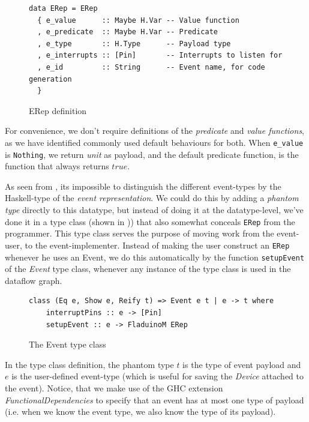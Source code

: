 \documentclass[a4paper, oneside, final]{memoir}
\let\Fref\undefined
\begin{document}
\begin{figure}
  \centering
\begin{verbatim}
data ERep = ERep
  { e_value      :: Maybe H.Var -- Value function
  , e_predicate  :: Maybe H.Var -- Predicate
  , e_type       :: H.Type      -- Payload type
  , e_interrupts :: [Pin]       -- Interrupts to listen for
  , e_id         :: String      -- Event name, for code generation
  }
\end{verbatim}

  \caption{ERep definition}
  \label{fig:Erep}
\end{figure}

For convenience, we don't require definitions of the
\textit{predicate} and \textit{value functions}, as we have identified
commonly used default behaviours for both. When \verb|e_value| is
\verb|Nothing|, we return \textit{unit} as payload, and the default
predicate function, is the function that always returns $true$.

As seen from \Fref{fig:Erep}, its impossible to distinguish the
different event-types by the Haskell-type of the \textit{event
  representation}. We could do this by adding a \textit{phantom type}
directly to this datatype, but instead of doing it at the
datatype-level, we've done it in a type class (shown in
\Fref{fig:Event type class})) that also somewhat conceals \verb|ERep| from
the programmer. This type class serves the purpose of moving work from
the event-user, to the event-implementer. Instead of making the user
construct an \verb|ERep| whenever he uses an Event, we do this
automatically by the function \verb|setupEvent| of the \textit{Event}
type class, whenever any instance of the type class is used in the
dataflow graph.

\begin{figure}
\centering
 \begin{verbatim}
class (Eq e, Show e, Reify t) => Event e t | e -> t where
    interruptPins :: e -> [Pin]
    setupEvent :: e -> FladuinoM ERep
\end{verbatim}
\caption{The Event type class}
\label{fig:Event type class}
\end{figure}

In the type class definition, the phantom type $t$ is the type of
event payload and $e$ is the user-defined event-type (which is useful
for saving the \textit{Device} attached to the event). Notice, that we
make use of the GHC extension \textit{FunctionalDependencies} to
specify that an event has at most one type of payload (i.e. when
we know the event type, we also know the type of its payload).
\end{document}
